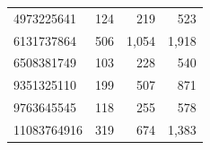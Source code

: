 \documentclass[12pt]{article}
\begin{document}
\begin{table}[htbp]
\begin{tabular}{lrrr}
    4973225641        & 124                   & 219                   & 523                    \\
    6131737864        & 506                   & 1,054                 & 1,918                  \\
    6508381749        & 103                   & 228                   & 540                    \\
    9351325110        & 199                   & 507                   & 871                    \\
    9763645545        & 118                   & 255                   & 578                    \\
    11083764916       & 319                   & 674                   & 1,383                  \\
    \bottomrule
  \end{tabular}
\end{table}
\end{document}
